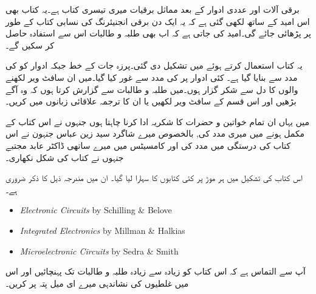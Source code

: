 \thispagestyle{empty}
برقی آلات اور عددی ادوار کے بعد مماثل برقیات میری تیسری کتاب ہے۔یہ کتاب بھی اس امید کے ساتھ لکھی گئی ہے کہ یہ ایک دن برقی انجنیئرنگ کی نسابی کتاب کے طور پر پڑھائی جائے گی۔امید کی جاتی ہے کہ اب بھی طلبہ و طالبات اس سے استفادہ حاصل کر سکیں گے۔

یہ کتاب  استعمال  کرتے ہوئے  میں تشکیل دی گئی۔پرزہ جات کے خط  جبکہ ادوار کو  کی مدد سے بنایا گیا ہے۔ کئی ادوار پر  کی مدد سے غور کیا گیا۔میں ان سافٹ ویر لکھنے والوں کا دل سے شکر گزار ہوں۔میں طلبہ و طالبات سے گزارش  کرتا ہوں کہ وہ آگے بڑھیں اور اس قسم کے سافٹ ویر لکھیں یا ان کا ترجمہ علاقائی زبانوں میں کریں۔

میں یہاں ان تمام خواتین و حضرات کا شکریہ ادا کرنا چاہتا ہوں جنہوں نے اس کتاب کے مکمل ہونے میں میری مدد کی, بالخصوص میرے شاگرد سید زین عباس جنہون نے اس کتاب کی درستگی میں مدد کی اور کامسیٹس میں میرے ساتھی ڈاکٹر عابد مجتبےٖ جنہوں نے کتاب کی شکل نکھاری۔

اس کتاب کی تشکیل میں ہر موڑ پر کئی کتابوں کا سہارا لیا گیا۔ ان میں مندرجہ ذیل کا ذکر ضروری ہے۔

\begin{itemize}
   \setlength\itemsep{-1em}
   \item {\textit{Electronic Circuits} by Schilling \& Belove}
   \item {\textit{Integrated Electronics} by Millman \& Halkias}
   \item {\textit{Microelectronic Circuits} by Sedra \& Smith}
\end{itemize}

آپ سے التماس ہے کہ اس کتاب کو زیادہ سے زیادہ طلبہ و طالبات تک پہنچائیں اور اس میں غلطیوں کی نشاندہی میرے ای میل پتہ پر کریں۔
\vspace{5mm}

{}
